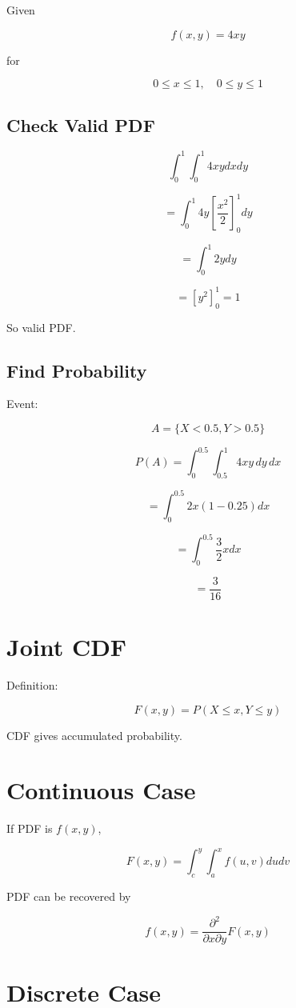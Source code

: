 \documentclass[12pt]{article}
\begin{document}
Given

\[
f(x,y) = 4xy
\]

for

\[
0 \le x \le 1, \quad 0 \le y \le 1
\]

\subsection{Check Valid PDF}

\[
\int_0^1 \int_0^1 4xy dx dy
\]

\[
= \int_0^1 4y \left[\frac{x^2}{2}\right]_0^1 dy
\]

\[
= \int_0^1 2y dy
\]

\[
= [y^2]_0^1 = 1
\]

So valid PDF.


\subsection{Find Probability}

Event:

\[
A = \{X < 0.5 , Y > 0.5\}
\]

\[
P(A)
=
\int_0^{0.5}
\int_{0.5}^{1}
4xy \, dy \, dx
\]

\[
=
\int_0^{0.5}
2x(1-0.25) dx
\]

\[
=
\int_0^{0.5}
\frac{3}{2}x dx
\]

\[
=
\frac{3}{16}
\]


\section{Joint CDF}

Definition:

\[
F(x,y) = P(X \le x , Y \le y)
\]

CDF gives accumulated probability.


\section{Continuous Case}

If PDF is $f(x,y)$,

\[
F(x,y)
=
\int_c^y
\int_a^x
f(u,v) du dv
\]

PDF can be recovered by

\[
f(x,y)
=
\frac{\partial^2}{\partial x \partial y}
F(x,y)
\]


\section{Discrete Case}
\end{document}
